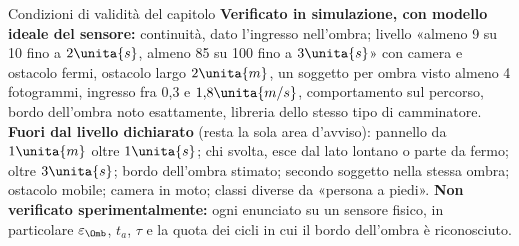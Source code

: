 \begin{riquadro}{Condizioni di validità del capitolo}
\textbf{Verificato in simulazione, con modello ideale del sensore:} continuità, dato l'ingresso nell'ombra; livello «almeno 9 su 10 fino a $2\unita{s}$, almeno 85 su 100 fino a $3\unita{s}$» con camera e ostacolo fermi, ostacolo largo $2\unita{m}$, un soggetto per ombra visto almeno 4 fotogrammi, ingresso fra 0,3 e $1{,}8\unita{m/s}$, comportamento sul percorso, bordo dell'ombra noto esattamente, libreria dello stesso tipo di camminatore.
\textbf{Fuori dal livello dichiarato} (resta la sola area d'avviso): pannello da $1\unita{m}$ oltre $1\unita{s}$; chi svolta, esce dal lato lontano o parte da fermo; oltre $3\unita{s}$; bordo dell'ombra stimato; secondo soggetto nella stessa ombra; ostacolo mobile; camera in moto; classi diverse da «persona a piedi».
\textbf{Non verificato sperimentalmente:} ogni enunciato su un sensore fisico, in particolare $\varepsilon_\Omb$, $t_a$, $\tau$ e la quota dei cicli in cui il bordo dell'ombra è riconosciuto.
\end{riquadro}
